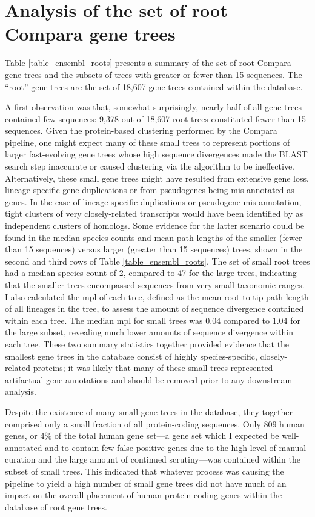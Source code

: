 \section{Analysis of the set of root Compara gene trees}
\label{section_root_compara_trees}

Table \ref{table_ensembl_roots} presents a summary of the set of root
Compara gene trees and the subsets of trees with greater or fewer than
15 sequences. The ``root'' gene trees are the set of 18,607 gene trees
contained within the \ens \cmp database.

A first observation was that, somewhat surprisingly, nearly half of
all \cmp gene trees contained few sequences: 9,378 out of 18,607 root
trees constituted fewer than 15 sequences. Given the protein-based
clustering performed by the Compara pipeline, one might expect many of
these small trees to represent portions of larger fast-evolving gene
trees whose high sequence divergences made the BLAST search step
inaccurate or caused clustering via the \hclust algorithm to be
ineffective. Alternatively, these small gene trees might have resulted
from extensive gene loss, lineage-specific gene duplications or from
pseudogenes being mis-annotated as genes. In the case of
lineage-specific duplications or pseudogene mis-annotation, tight
clusters of very closely-related transcripts would have been
identified by \hclust as independent clusters of homologs. Some
evidence for the latter scenario could be found in the median species
counts and mean path lengths of the smaller (fewer than 15 sequences)
versus larger (greater than 15 sequences) trees, shown in the second
and third rows of Table \ref{table_ensembl_roots}. The set of small
root trees had a median species count of 2, compared to 47 for the
large trees, indicating that the smaller trees encompassed sequences
from very small taxonomic ranges. I also calculated the \ac{mpl} of
each tree, defined as the mean root-to-tip path length of all lineages
in the tree, to assess the amount of sequence divergence contained
within each tree. The median \ac{mpl} for small trees was 0.04
compared to 1.04 for the large subset, revealing much lower amounts of
sequence divergence within each tree. These two summary statistics
together provided evidence that the smallest gene trees in the \cmp
database consist of highly species-specific, closely-related proteins;
it was likely that many of these small trees represented artifactual
gene annotations and should be removed prior to any downstream
analysis.

Despite the existence of many small gene trees in the \cmp database,
they together comprised only a small fraction of all protein-coding
sequences. Only 809 human genes, or 4\% of the total human gene
set---a gene set which I expected be well-annotated and to contain few
false positive genes due to the high level of manual curation and the
large amount of continued scrutiny---was contained within the subset
of small trees. This indicated that whatever process was causing the
\cmp pipeline to yield a high number of small gene trees did not have
much of an impact on the overall placement of human protein-coding
genes within the database of root \cmp gene trees.

